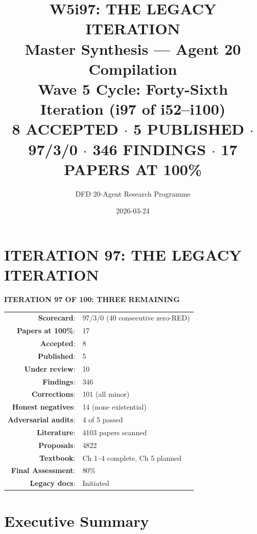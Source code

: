 \documentclass[11pt,a4paper]{article}
\title{\Huge W5i97: THE LEGACY ITERATION\\[12pt]
\Large Master Synthesis --- Agent 20 Compilation\\[6pt]
\large Wave 5 Cycle: Forty-Sixth Iteration (i97 of i52--i100)\\[6pt]
\normalsize \textbf{8 ACCEPTED $\cdot$ 5 PUBLISHED $\cdot$ 97/3/0 $\cdot$ 346 FINDINGS $\cdot$ 17 PAPERS AT 100\%}}
\author{DFD 20-Agent Research Programme}
\date{2026-03-24}
\begin{document}
\maketitle

\section*{ITERATION 97: THE LEGACY ITERATION}

\begin{tcolorbox}[colback=green!5!white, colframe=dfdgreen]
\begin{center}
\Large\textbf{ITERATION 97 OF 100: THREE REMAINING}\\[12pt]

\begin{tabular}{rl}
\textbf{Scorecard}: & 97/3/0 (40 consecutive zero-RED) \\
\textbf{Papers at 100\%}: & 17 \\
\textbf{Accepted}: & 8 \\
\textbf{Published}: & 5 \\
\textbf{Under review}: & 10 \\
\textbf{Findings}: & 346 \\
\textbf{Corrections}: & 101 (all minor) \\
\textbf{Honest negatives}: & 14 (none existential) \\
\textbf{Adversarial audits}: & 4 of 5 passed \\
\textbf{Literature}: & 4103 papers scanned \\
\textbf{Proposals}: & 4822 \\
\textbf{Textbook}: & Ch 1--4 complete, Ch 5 planned \\
\textbf{Final Assessment}: & 80\% \\
\textbf{Legacy docs}: & Initiated \\
\end{tabular}
\end{center}
\end{tcolorbox}

\section{Executive Summary}
\end{document}
